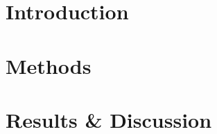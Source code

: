 \tableofcontents
\listoffigures
\listoftables



\clearpage
{}

\chapter{Introduction}


\clearpage

\chapter{Methods}


\clearpage

\chapter{Results \& Discussion}


\clearpage

\printbibliography




